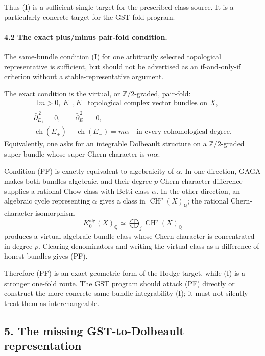 Thus (I) is a sufficient single target for the prescribed-class source. It is a particularly concrete target for the GST fold program.

\paragraph{4.2 The exact plus/minus pair-fold condition.}
The same-bundle condition (I) for one arbitrarily selected topological representative is sufficient, but should not be advertised as an if-and-only-if criterion without a stable-representative argument.

The exact condition is the virtual, or \(\mathbb Z/2\)-graded, pair-fold:
\[
\boxed{
\begin{gathered}
\exists\,m>0,\ E_+,E_-\text{ topological complex vector bundles on }X,\\
\bar\partial_{E_+}^{\,2}=0,\qquad
\bar\partial_{E_-}^{\,2}=0,\\
\operatorname{ch}(E_+)-\operatorname{ch}(E_-)=m\alpha
\quad\text{in every cohomological degree.}
\end{gathered}}
\tag{PF}
\]
Equivalently, one asks for an integrable Dolbeault structure on a \(\mathbb Z/2\)-graded super-bundle whose super-Chern character is \(m\alpha\).

Condition (PF) is exactly equivalent to algebraicity of \(\alpha\). In one direction, GAGA makes both bundles algebraic, and their degree-\(p\) Chern-character difference supplies a rational Chow class with Betti class \(\alpha\). In the other direction, an algebraic cycle representing \(\alpha\) gives a class in \(\operatorname{CH}^p(X)_{\mathbb Q}\); the rational Chern-character isomorphism
\[
K_0^{\mathrm{alg}}(X)_{\mathbb Q}
\simeq
\bigoplus_j\operatorname{CH}^j(X)_{\mathbb Q}
\]
produces a virtual algebraic bundle class whose Chern character is concentrated in degree \(p\). Clearing denominators and writing the virtual class as a difference of honest bundles gives (PF).

Therefore (PF) is an exact geometric form of the Hodge target, while (I) is a stronger one-fold route. The GST program should attack (PF) directly or construct the more concrete same-bundle integrability (I); it must not silently treat them as interchangeable.

\subsection*{5. The missing GST-to-Dolbeault representation}

